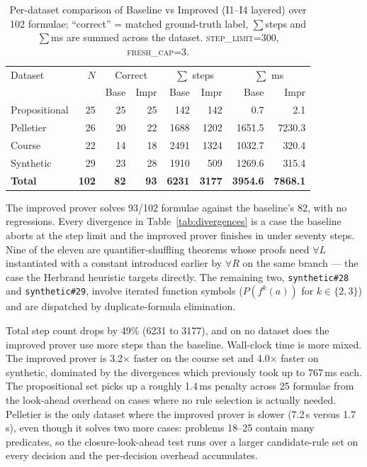 \documentclass[runningheads]{llncs}
\begin{document}
\begin{table}[!htb]
  \caption{Per-dataset comparison of Baseline vs Improved
  (I1--I4 layered) over 102 formulae; ``correct'' = matched ground-truth
  label, $\sum$steps and $\sum$ms are summed across the dataset.
  \textsc{step\_limit}=300, \textsc{fresh\_cap}=3.}
  \label{tab:results}
  \centering
  \begin{tabular}{lrrrrrrr}
    \toprule
    Dataset & $N$ & \multicolumn{2}{c}{Correct} & \multicolumn{2}{c}{$\sum$ steps} & \multicolumn{2}{c}{$\sum$ ms} \\
            &     & Base & Impr & Base  & Impr  & Base  & Impr  \\
    \midrule
    Propositional & 25 & 25 & 25 &  142 &  142 &    0.7 &    2.1 \\
    Pelletier     & 26 & 20 & 22 & 1688 & 1202 & 1651.5 & 7230.3 \\
    Course        & 22 & 14 & 18 & 2491 & 1324 & 1032.7 &  320.4 \\
    Synthetic     & 29 & 23 & 28 & 1910 &  509 & 1269.6 &  315.4 \\
    \midrule
    \textbf{Total} & \textbf{102} & \textbf{82} & \textbf{93}
                   & \textbf{6231} & \textbf{3177}
                   & \textbf{3954.6} & \textbf{7868.1} \\
    \bottomrule
  \end{tabular}
\end{table}


The improved prover solves 93/102 formulae against the baseline's 82,
with no regressions. Every divergence in Table~\ref{tab:divergences}
is a case the baseline aborts at the step limit and the improved
prover finishes in under seventy steps. Nine of the eleven are
quantifier-shuffling theorems whose proofs need $\forall L$
instantiated with a constant introduced earlier by $\forall R$ on the
same branch — the case the Herbrand heuristic targets directly.
The remaining two, \texttt{synthetic\#28} and \texttt{synthetic\#29},
involve iterated function symbols ($P(f^k(a))$ for $k\in\{2,3\}$) and
are dispatched by duplicate-formula elimination.

Total step count drops by 49\% (6231 to 3177), and on no dataset does
the improved prover use more steps than the baseline. Wall-clock time
is more mixed. The improved prover is 3.2$\times$ faster on the course
set and 4.0$\times$ faster on synthetic, dominated by the divergences
which previously took up to 767\,ms each. The propositional set picks
up a roughly 1.4\,ms penalty across 25 formulae from the look-ahead
overhead on cases where no rule selection is actually needed. Pelletier
is the only dataset where the improved prover is slower (7.2\,s versus
1.7\,s), even though it solves two more cases: problems 18--25 contain
many predicates, so the closure-look-ahead test runs over a larger
candidate-rule set on every decision and the per-decision overhead
accumulates.
\end{document}
